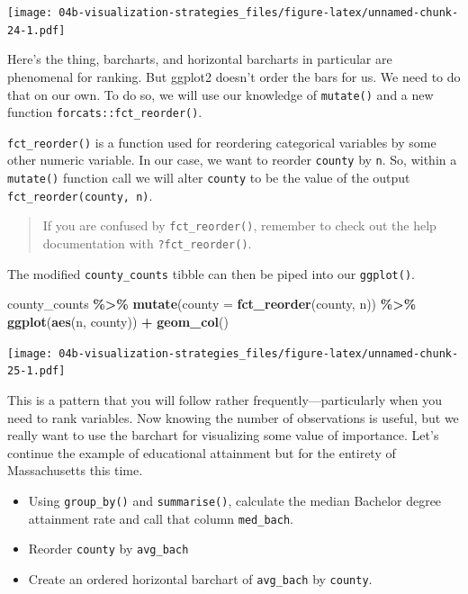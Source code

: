 \documentclass[
]{book}
\newenvironment{Shaded}{\begin{snugshade}}{\end{snugshade}}
\newcommand{\DataTypeTok}[1]{\textcolor[rgb]{0.13,0.29,0.53}{#1}}
\newcommand{\KeywordTok}[1]{\textcolor[rgb]{0.13,0.29,0.53}{\textbf{#1}}}
\newcommand{\NormalTok}[1]{#1}
\newcommand{\OperatorTok}[1]{\textcolor[rgb]{0.81,0.36,0.00}{\textbf{#1}}}
\newcommand{\StringTok}[1]{\textcolor[rgb]{0.31,0.60,0.02}{#1}}
\providecommand{\tightlist}{%
  \setlength{\itemsep}{0pt}\setlength{\parskip}{0pt}}
\begin{document}
\texttt{[image: 04b-visualization-strategies\_files/figure-latex/unnamed-chunk-24-1.pdf]}

Here's the thing, barcharts, and horizontal barcharts in particular are phenomenal for ranking. But ggplot2 doesn't order the bars for us. We need to do that on our own. To do so, we will use our knowledge of \texttt{mutate()} and a new function \texttt{forcats::fct\_reorder()}.

\texttt{fct\_reorder()} is a function used for reordering categorical variables by some other numeric variable. In our case, we want to reorder \texttt{county} by \texttt{n}. So, within a \texttt{mutate()} function call we will alter \texttt{county} to be the value of the output \texttt{fct\_reorder(county,\ n)}.

\begin{quote}
If you are confused by \texttt{fct\_reorder()}, remember to check out the help documentation with \texttt{?fct\_reorder()}.
\end{quote}

The modified \texttt{county\_counts} tibble can then be piped into our \texttt{ggplot()}.

\begin{Shaded}
\begin{Highlighting}[]
\NormalTok{county\_counts }\OperatorTok{\%\textgreater{}\%}\StringTok{ }
\StringTok{  }\KeywordTok{mutate}\NormalTok{(}\DataTypeTok{county =} \KeywordTok{fct\_reorder}\NormalTok{(county, n)) }\OperatorTok{\%\textgreater{}\%}\StringTok{ }
\StringTok{  }\KeywordTok{ggplot}\NormalTok{(}\KeywordTok{aes}\NormalTok{(n, county)) }\OperatorTok{+}
\StringTok{  }\KeywordTok{geom\_col}\NormalTok{()}
\end{Highlighting}
\end{Shaded}

\texttt{[image: 04b-visualization-strategies\_files/figure-latex/unnamed-chunk-25-1.pdf]}

This is a pattern that you will follow rather frequently---particularly when you need to rank variables. Now knowing the number of observations is useful, but we really want to use the barchart for visualizing some value of importance. Let's continue the example of educational attainment but for the entirety of Massachusetts this time.

\begin{itemize}
\tightlist
\item
  Using \texttt{group\_by()} and \texttt{summarise()}, calculate the median Bachelor degree attainment rate and call that column \texttt{med\_bach}.
\item
  Reorder \texttt{county} by \texttt{avg\_bach}
\item
  Create an ordered horizontal barchart of \texttt{avg\_bach} by \texttt{county}.
\end{itemize}
\end{document}
